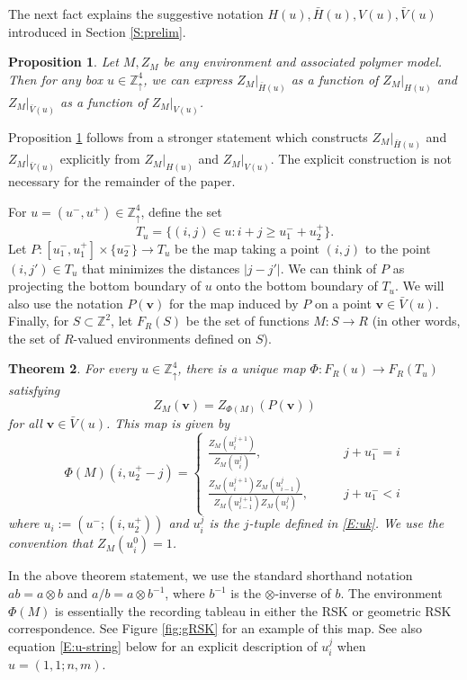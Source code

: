 \documentclass[aop, preprint]{imsart}
\theoremstyle{plain}
\newtheorem{theorem}{Theorem}[section]
\newtheorem{prop}[theorem]{Proposition}%
\theoremstyle{definition}
\theoremstyle{plain}
\newcommand{\sset}{\subset}
\newcommand{\Zd}{\mathds{Z}^4_\uparrow}
\newcommand{\Z}{\mathds{Z}}
\newcommand{\X}{\times}
\newcommand{\bv}{\mathbf{v}}
\begin{document}
The next fact explains the suggestive notation $H(u), \bar H(u), V(u), \bar V(u)$ introduced in Section \ref{S:prelim}.

\begin{prop}
	\label{P:measurable-fn} Let $M, Z_M$ be any environment and associated polymer model.
Then for any box $u \in \Zd$, we can express $Z_M|_{\bar H(u)}$ as a function of 
$Z_M|_{H(u)}$ and $Z_M|_{\bar V(u)}$ as a function of 
$Z_M|_{V(u)}$.
\end{prop}

Proposition \ref{P:measurable-fn} follows from a stronger statement which constructs $Z_M|_{\bar H(u)}$ and $Z_M|_{\bar V(u)}$ explicitly from 
$Z_M|_{H(u)}$ and $Z_M|_{V(u)}$. The explicit construction is not necessary for the remainder of the paper.

For $u = (u^-, u^+) \in \Zd$, define the set
$$
T_u = \{(i, j) \in u : i + j \ge u_1^- + u_2^+ \}.
$$
Let $P:[u^-_1, u^+_1] \X \{u^-_2\} \to T_u$ be the map taking a point $(i, j)$ to the point $(i, j') \in T_u$ that minimizes the distances $|j - j'|$. We can think of $P$ as projecting the bottom boundary of $u$ onto the bottom boundary of $T_u$. We will also use the notation $P(\bv)$ for the map induced by $P$ on a point 
$
\bv \in \bar V(u).
$
Finally, for $S \sset \Z^2$, let $F_{R}(S)$ be the set of functions  $M:S \to R$ (in other words, the set of $R$-valued environments defined on $S$).


\begin{theorem}
	\label{T:encoding-lpp}
	For every $u \in \Zd$, there is a unique map $\Phi:F_{R}(u) \to F_{R}(T_u)$ satisfying
	\begin{equation}
	\label{E:ZM}
	Z_M(\bv) = Z_{\Phi(M)}(P(\bv))
	\end{equation}
	for all $\bv \in \bar V(u)$. This map is given by
	$$
	\Phi(M)(i, u_2^+ - j) = \begin{cases}
	\frac{Z_M(u_i^{j+1})}{Z_M(u_{i}^{j})}, \qquad &j + u^-_1 = i \\
	\frac{Z_M(u_i^{j+1})  Z_M(u_{i-1}^{j})}{Z_M(u_{i-1}^{j+1}) Z_M(u_{i}^{j})}, \qquad &j + u^-_1 < i 
	\end{cases}
	$$
	where $u_i := (u^-;(i, u_2^+))$ and $u_i^j$ is the $j$-tuple defined in \eqref{E:uk}. We use the convention that $Z_M(u_i^0) = 1$.
\end{theorem}

In the above theorem statement, we use the standard shorthand notation $ab = a \otimes b$ and $a/b = a \otimes b^{-1}$, where $b^{-1}$ is the $\otimes$-inverse of $b$. The environment $\Phi(M)$ is essentially the recording tableau in either the RSK or geometric RSK correspondence. See Figure \ref{fig:gRSK} for an example of this map. See also equation \eqref{E:u-string} below for an explicit description of $u^j_i$ when $u = (1,1; n, m)$.
\end{document}
